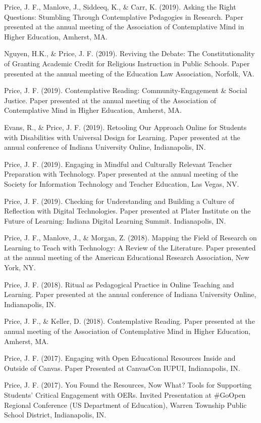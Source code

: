 \documentclass[11pt,article,oneside]{memoir}
\begin{document}
\ind Price, J. F., Manlove, J., Siddeeq, K., \& Carr, K. (2019). Asking the Right Questions: Stumbling Through Contemplative Pedagogies in Research. Paper presented at the annual meeting of the Association of Contemplative Mind in Higher Education, Amherst, MA.

\ind Nguyen, H.K., \& Price, J. F. (2019). Reviving the Debate: The Constitutionality of Granting Academic Credit for Religious Instruction in Public Schools. Paper presented at the annual meeting of the Education Law Association, Norfolk, VA.

\ind Price, J. F. (2019). Contemplative Reading: Community-Engagement \& Social Justice. Paper presented at the annual meeting of the Association of Contemplative Mind in Higher Education, Amherst, MA.

\ind Evans, R., \& Price, J. F. (2019). Retooling Our Approach Online for Students with Disabilities with Universal Design for Learning. Paper presented at the annual conference of Indiana University Online, Indianapolis, IN.

\ind Price, J. F. (2019). Engaging in Mindful and Culturally Relevant Teacher Preparation with Technology. Paper presented at the annual meeting of the Society for Information Technology and Teacher Education, Las Vegas, NV.

\ind Price, J. F. (2019). Checking for Understanding and Building a Culture of Reflection with Digital Technologies. Paper presented at Plater Institute on the Future of Learning: Indiana Digital Learning Summit. Indianapolis, IN.

\ind Price, J. F., Manlove, J., \& Morgan, Z. (2018). Mapping the Field of Research on Learning to Teach with Technology: A Review of the Literature. Paper presented at the annual meeting of the American Educational Research Association, New York, NY.

\ind Price, J. F. (2018). Ritual as Pedagogical Practice in Online Teaching and Learning. Paper presented at the annual conference of Indiana University Online, Indianapolis, IN.

\ind Price, J. F., \& Keller, D. (2018). Contemplative Reading. Paper presented at the annual meeting of the Association of Contemplative Mind in Higher Education, Amherst, MA.

\ind Price, J. F. (2017). Engaging with Open Educational Resources Inside and Outside of Canvas. Paper Presented at CanvasCon IUPUI, Indianapolis, IN.

\ind Price, J. F. (2017). You Found the Resources, Now What? Tools for Supporting Students’ Critical Engagement with OERs. Invited Presentation at \#GoOpen Regional Conference (US Department of Education), Warren Township Public School District, Indianapolis, IN.
\end{document}
